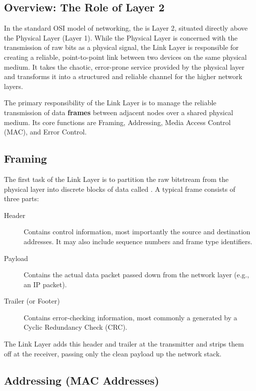 \subsection{Overview: The Role of Layer 2}

In the standard OSI model of networking, the  is Layer 2, situated directly above the Physical Layer (Layer 1). While the Physical Layer is concerned with the transmission of raw bits as a physical signal, the Link Layer is responsible for creating a reliable, point-to-point link between two devices on the same physical medium. It takes the chaotic, error-prone service provided by the physical layer and transforms it into a structured and reliable channel for the higher network layers.

\begin{keyconcept}
    The primary responsibility of the Link Layer is to manage the reliable transmission of data \textbf{frames} between adjacent nodes over a shared physical medium. Its core functions are Framing, Addressing, Media Access Control (MAC), and Error Control.
\end{keyconcept}

\subsection{Framing}

The first task of the Link Layer is to partition the raw bitstream from the physical layer into discrete blocks of data called . A typical frame consists of three parts:
\begin{description}
    \item[Header] Contains control information, most importantly the source and destination addresses. It may also include sequence numbers and frame type identifiers.
    \item[Payload] Contains the actual data packet passed down from the network layer (e.g., an IP packet).
    \item[Trailer (or Footer)] Contains error-checking information, most commonly a  generated by a Cyclic Redundancy Check (CRC).
\end{description}
The Link Layer adds this header and trailer at the transmitter and strips them off at the receiver, passing only the clean payload up the network stack.

\subsection{Addressing (MAC Addresses)}

